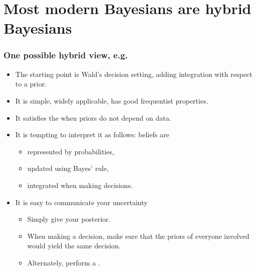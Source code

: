 \documentclass[10pt]{beamer}
\begin{document}
\section{Most modern Bayesians are hybrid Bayesians}
\begin{frame}
  \frametitle{One possible hybrid view, e.g. \citep{Rob07}}
  \begin{itemize}
    \item The starting point is Wald's decision setting, adding integration with respect to a prior.
    \vfill
    \item It is simple, widely applicable, has good frequentist properties.
    \vfill
    \item It satisfies the  when priors do not depend on data.
    \vfill
    \item It is tempting to interpret it as follows: beliefs are
    \vfill
    \begin{itemize}
      \item represented by probabilities,
      \item updated using Bayes' rule,
      \item integrated when making decisions.
    \end{itemize}
    \vfill
    \item It is easy to communicate your uncertainty
    \vfill
    \begin{itemize}
      \item Simply give your posterior.
      \item When making a decision, make sure that the priors of everyone involved would yield the same decision.
      \item Alternately, perform a .
    \end{itemize}
  \end{itemize}
\end{frame}
\end{document}
